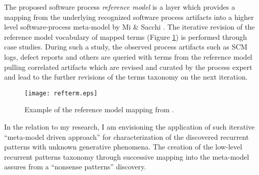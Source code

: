The proposed software process \textit{reference model} is a layer which provides a mapping from the underlying recognized software process artifacts into a higher level software-process meta-model by Mi \& Sacchi \cite{citeulike:5128872}. The iterative revision of the reference model vocabulary of mapped terms (Figure \ref{fig:refterm}) is performed through case studies. During such a study, the observed process artifacts such as SCM logs, defect reports and others are queried with terms from the reference model pulling correlated artifacts which are revised and curated by the process expert and lead to the further revisions of the terms taxonomy on the next iteration.

\begin{figure}[tbp]
   \centering
   \texttt{[image: refterm.eps]}
   \caption{Example of the reference model mapping from \cite{citeulike:5043664}.}
   \label{fig:refterm}
\end{figure}

In the relation to my research, I am envisioning the application of such iterative ``meta-model driven approach'' for characterization of the discovered recurrent patterns with unknown generative phenomena. The creation of the low-level recurrent patterns taxonomy through successive mapping into the meta-model assures from a ``nonsense patterns'' discovery.

